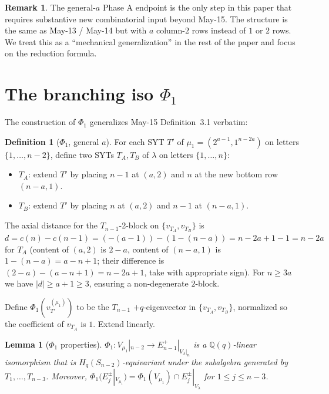 \documentclass[11pt]{article}
\newtheorem{lemma}[theorem]{Lemma}
\theoremstyle{definition}
\newtheorem{definition}[theorem]{Definition}
\newtheorem{remark}[theorem]{Remark}
\begin{document}
\begin{remark}
The general-$a$ Phase A endpoint is the only step in this paper
that requires substantive new combinatorial input beyond May-15.
The structure is the same as May-13 / May-14 but with $a$
column-$2$ rows instead of $1$ or $2$ rows.  We treat this as a
``mechanical generalization'' in the rest of the paper and focus
on the reduction formula.
\end{remark}

\section{The branching iso $\Phi_1$}\label{sec:Phi}

The construction of $\Phi_1$ generalizes May-15 Definition~3.1
verbatim:

\begin{definition}[$\Phi_1$, general $a$]\label{def:Phi1}
For each SYT $T'$ of $\mu_1=(2^{a-1},1^{n-2a})$ on letters
$\{1,\ldots,n-2\}$, define two SYTs $T_A,T_B$ of $\lambda$ on
letters $\{1,\ldots,n\}$:
\begin{itemize}[leftmargin=2em,topsep=0.3em,itemsep=0.2em]
\item $T_A$: extend $T'$ by placing $n-1$ at $(a,2)$ and $n$ at
the new bottom row $(n-a,1)$.
\item $T_B$: extend $T'$ by placing $n$ at $(a,2)$ and $n-1$ at
$(n-a,1)$.
\end{itemize}
The axial distance for the $T_{n-1}$-2-block on
$\{v_{T_A},v_{T_B}\}$ is
$d=c(n)-c(n-1)=(-(a-1))-(1-(n-a))=n-2a+1-1=n-2a$ for $T_A$
(content of $(a,2)$ is $2-a$, content of $(n-a,1)$ is $1-(n-a)=a-n+1$;
their difference is $(2-a)-(a-n+1)=n-2a+1$, take with appropriate
sign).  For $n\ge 3a$ we have $|d|\ge a+1\ge 3$, ensuring a
non-degenerate $2$-block.

Define $\Phi_1(v_{T'}^{(\mu_1)})$ to be the $T_{n-1}$
$+q$-eigenvector in $\{v_{T_A},v_{T_B}\}$, normalized so the
coefficient of $v_{T_A}$ is $1$.  Extend linearly.
\end{definition}

\begin{lemma}[$\Phi_1$ properties]\label{lem:Phi}
$\Phi_1: V_{\mu_1}|_{n-2}\to E_{n-1}^+|_{V_\lambda|_n}$ is a
$\mathbb{Q}(q)$-linear isomorphism that is
$H_q(S_{n-2})$-equivariant under the subalgebra generated by
$T_1,\ldots,T_{n-3}$.  Moreover, $\Phi_1(E_j^\pm|_{V_{\mu_1}})=
\Phi_1(V_{\mu_1})\cap E_j^\pm|_{V_\lambda}$ for $1\le j\le n-3$.
\end{lemma}
\end{document}
